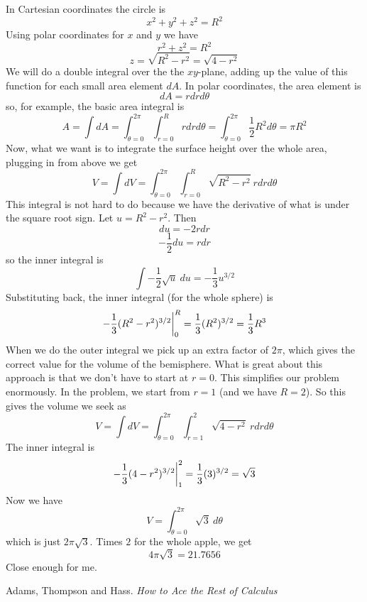 \documentclass[11pt, oneside]{article}   	%
\begin{document}
In Cartesian coordinates the circle is
\[ x^2 + y^2 + z^2 = R^2 \]
Using polar coordinates for $x$ and $y$ we have 
\[ r^2 + z^2 = R^2 \]
\[ z = \sqrt{R^2 - r^2} = \sqrt{4 - r^2}  \]
We will do a double integral over the the $xy$-plane, adding up the value of this function for each small area element $dA$.  In polar coordinates, the area element is
\[ dA = r dr d \theta \]
so, for example, the basic area integral is
\[ A = \int dA = \int_{\theta=0}^{2 \pi} \int_{r=0}^R r dr d \theta = \int_{\theta=0}^{2 \pi} \frac{1}{2}R^2 d \theta = \pi R^2 \]
Now, what we want is to integrate the surface height over the whole area, plugging in from above we get
\[ V = \int dV = \int_{\theta=0}^{2 \pi} \int_{r=0}^R \sqrt{R^2 - r^2}  \ r dr d \theta \]
This integral is not hard to do because we have the derivative of what is under the square root sign.  Let $u = R^2 - r^2$.  Then
\[ du = -2r dr \]
\[ -\frac{1}{2} du = r dr \]
so the inner integral is
\[ \int -\frac{1}{2} \sqrt{u}\  du = -\frac{1}{3} u^{3/2} \]
Substituting back, the inner integral (for the whole sphere) is 
\[ -\frac{1}{3} (R^2 -r^2)^{3/2} \bigg{|}_0^R = \frac{1}{3}(R^2)^{3/2} =  \frac{1}{3} R^3 \]
When we do the outer integral we pick up an extra factor of $2\pi$, which gives the correct value for the volume of the bemisphere.
What is great about this approach is that we don't have to start at $r=0$.  This simplifies our problem enormously.  In the problem, we start from $r=1$ (and we have $R=2$).  So this gives the volume we seek as
\[ V = \int dV = \int_{\theta=0}^{2 \pi} \int_{r=1}^2 \sqrt{4 - r^2}  \ r dr d \theta \]
The inner integral is
\[ -\frac{1}{3} (4 -r^2)^{3/2} \bigg{|}_1^2 = \frac{1}{3}(3)^{3/2} =  \sqrt{3} \]
Now we have
\[ V =  \int_{\theta=0}^{2 \pi} \sqrt{3} \ d \theta \]
which is just $2\pi \sqrt{3}$.  Times $2$ for the whole apple, we get
\[ 4 \pi \sqrt{3} = 21.7656 \]
Close enough for me.
\vspace{10 mm}

\noindent
Adams, Thompson and Hass.  \emph{How to Ace the Rest of Calculus}
\end{document}
